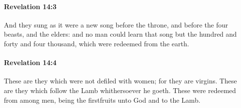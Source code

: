 		\paragraph{Revelation 14:3} %
			\label{REVELATIONNT-14-3}

			And they sung as it were a new song before the throne, and before the four beasts, and the elders: and no man could learn that song but the hundred and forty and four thousand, which were redeemed from the earth.

			\begin{framed}
			\scriptsize
				\begin{compactdesc}
					\item[SBLG] 
				\end{compactdesc}
			\end{framed}

		\paragraph{Revelation 14:4} %
			\label{REVELATIONNT-14-4}

			These are they which were not defiled with women; for they are virgins. These are they which follow the Lamb whithersoever he goeth. These were redeemed from among men, being the firstfruits unto God and to the Lamb.

